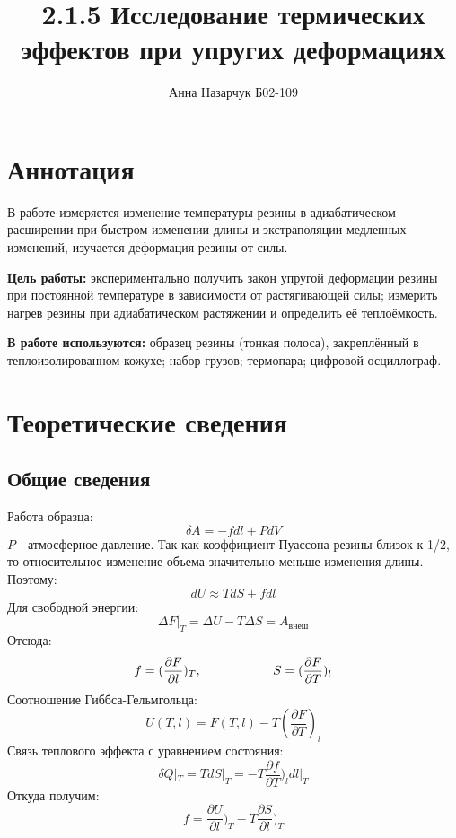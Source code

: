 \documentclass[a4paper,12pt]{article} %
\author{Анна Назарчук Б02-109}
\title{2.1.5 Исследование термических эффектов при упругих деформациях}
\date{}
\begin{document}
\maketitle
\section{Аннотация}
В работе измеряется изменение температуры резины в адиабатическом расширении при быстром изменении длины и экстраполяции медленных изменений, изучается деформация резины от силы.
 
\textbf{Цель работы:} экспериментально получить закон упругой деформации резины при постоянной температуре в зависимости от растягивающей силы; измерить нагрев резины
при адиабатическом растяжении и определить её теплоёмкость.

\textbf{В работе используются:} образец резины (тонкая полоса), закреплённый в теплоизолированном кожухе; набор грузов; термопара; цифровой осциллограф.

\section{Теоретические сведения}
\subsection{Общие сведения}
Работа образца:
\begin{equation}
\delta A = -fdl +PdV
\end{equation}
$P$ - атмосферное давление. Так как коэффициент Пуассона резины близок к 1/2, то относительное изменение объема значительно меньше изменения длины. Поэтому:
\begin{equation}
dU \approx TdS + fdl
\end{equation}
Для свободной энергии:
\begin{equation}
\Delta F|_T = \Delta U - T\Delta S = A_{внеш}
\end{equation}
Отсюда:
\begin{equation}
f = (\frac{\partial F}{\partial l})_T, \hspace*{20mm}  S = (\frac{\partial F}{\partial T})_l
\end{equation}
Соотношение Гиббса-Гельмгольца:
\begin{equation}
U(T, l) = F(T, l) - T(\frac{\partial F}{\partial T})_l
\end{equation}
Связь теплового эффекта с уравнением состояния:
\begin{equation}
\delta Q|_T = TdS|_T= -T\frac{\partial f}{\partial T})_l dl|_T
\end{equation}
Откуда получим:
\begin{equation}
f = \frac{\partial U}{\partial l})_T - T\frac{\partial S}{\partial l})_T
\end{equation}
\end{document}
